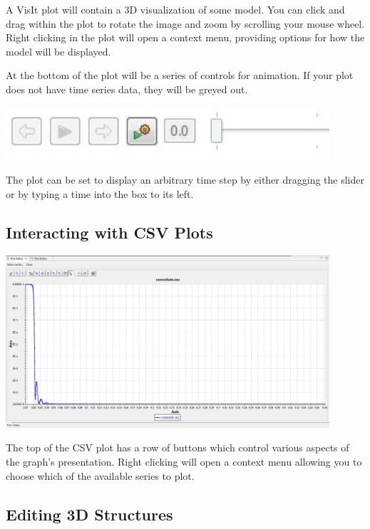 A VisIt plot will contain a 3D visualization of some model. You can click and
drag within the plot to rotate the image and zoom by scrolling your mouse wheel.
Right clicking in the plot will open a context menu, providing options for how
the model will be displayed.

At the bottom of the plot will be a series of controls for animation. If your
plot does not have time series data, they will be greyed out. 

\begin{center}
\includegraphics[width=12cm]{images/TimeSliderWidget} 
\end{center}

The plot can be set to display an arbitrary time step by either dragging the
slider or by typing a time into the box to its left.

\subsection{Interacting with CSV Plots}

\begin{center}
\includegraphics[width=12cm]{images/CSVGraph}
\end{center}

The top of the CSV plot has a row of buttons which control various aspects of
the graph's presentation. Right clicking will open a context menu allowing you
to choose which of the available series to plot.

\subsection{Editing 3D Structures}

